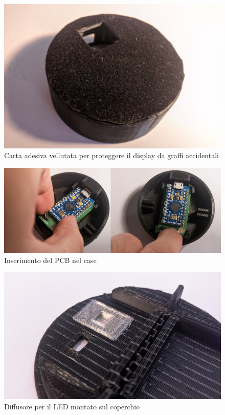 \begin{figure}[H]
	\centering
	\includegraphics[width=\textwidth]{Dispositivo_files/assembly_13.jpg}
	\caption{Carta adesiva vellutata per proteggere il display da graffi accidentali}
	\label{fig:assembly_13}
\end{figure}

\begin{figure}[H]
	\centering
	\includegraphics[width=\textwidth]{Dispositivo_files/assembly_14.jpg}
	\caption{Inserimento del PCB nel case}
	\label{fig:assembly_14}
\end{figure}

\begin{figure}[H]
	\centering
	\includegraphics[width=\textwidth]{Dispositivo_files/assembly_16.jpg}
	\caption{Diffusore per il LED montato sul coperchio}
	\label{fig:assembly_16}
\end{figure}

